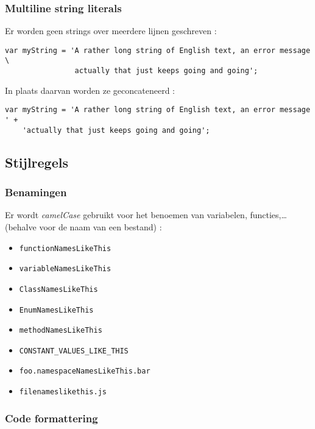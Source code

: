 \subsubsection{Multiline string literals}

Er worden geen strings over meerdere lijnen geschreven :\\
\begin{lstlisting}
var myString = 'A rather long string of English text, an error message \
                actually that just keeps going and going';
\end{lstlisting}

In plaats daarvan worden ze geconcateneerd :\\
\begin{lstlisting}
var myString = 'A rather long string of English text, an error message ' +
    'actually that just keeps going and going';
\end{lstlisting}

\subsection{Stijlregels}

\subsubsection{Benamingen}

Er wordt \textit{camelCase} gebruikt voor het benoemen van variabelen, functies,\ldots (behalve voor de naam van een bestand) :
\begin{itemize}
	\item \lstinline{functionNamesLikeThis}
	\item \lstinline{variableNamesLikeThis}
	\item \lstinline{ClassNamesLikeThis}
	\item \lstinline{EnumNamesLikeThis}
	\item \lstinline{methodNamesLikeThis}
	\item \lstinline{CONSTANT_VALUES_LIKE_THIS}
	\item \lstinline{foo.namespaceNamesLikeThis.bar}
	\item \lstinline{filenameslikethis.js}
\end{itemize}

\subsubsection{Code formattering}

